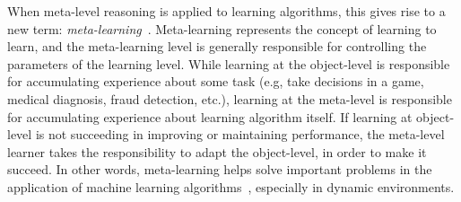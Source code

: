 When meta-level reasoning is applied to learning algorithms, this gives rise to a new term: \textit{meta-learning}~\cite{schweighofer2003meta, doya2002metalearning}.
Meta-learning represents the concept of learning to learn, and the meta-learning level is generally responsible for controlling the parameters of the learning level.
While learning at the object-level is responsible for accumulating experience about some task (e.g, take decisions in a game, medical diagnosis, fraud detection, etc.), learning at the meta-level is responsible for accumulating experience about learning algorithm itself. 
If learning at object-level is not succeeding in improving or maintaining performance, the meta-level learner takes the responsibility to adapt the object-level, in order to make it succeed.
In other words, meta-learning helps solve important problems in the application of machine learning algorithms~\cite{vilalta2004using}, especially in dynamic environments.